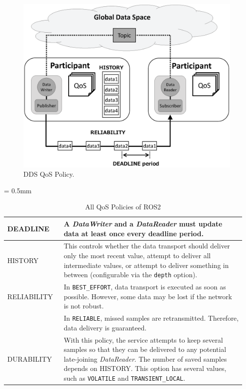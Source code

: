 \documentclass{sig-alternate-05-2015}
\begin{document}
\begin{figure}[t]
  \centering
  \includegraphics[width=0.8\linewidth]{../figure/DDS_qos.eps}
  \vspace{-3mm}
  \caption{\label{fig:orgparagraph4}
    DDS QoS Policy.}
  \vspace{-5mm}
\end{figure}

\renewcommand{\arraystretch}{1.0}
\begin{table}[t]
  \caption{\label{tab:orgtable1}
    All QoS Policies of ROS2}
  \centering
  \small
  \tabcolsep = 0.5mm              %
  \begin{tabular}{|p{0.23\linewidth}|p{0.74\linewidth}|}
    \hline
    DEADLINE &  A \emph{DataWriter} and a \emph{DataReader} must update data at least once every deadline period.\\
    \hline
    HISTORY &  This controls whether the data transport should deliver only the most recent value, attempt to deliver all intermediate values, or attempt to deliver something in between (configurable via the \texttt{depth} option).\\
    \hline
    RELIABILITY & In \texttt{BEST\_EFFORT}, data transport is executed as soon as possible. However, some data may be lost if the network is not robust. \\
    & In \texttt{RELIABLE}, missed samples are retransmitted. Therefore, data delivery is guaranteed.\\
    \hline
    DURABILITY & With this policy, the service attempts to keep several samples so that they can be delivered to any potential late-joining \emph{DataReader}. The number of saved samples depends on HISTORY. This option has several values, such as \texttt{VOLATILE} and \texttt{TRANSIENT\_LOCAL}.\\
    \hline
  \end{tabular}
  \vspace{-7mm}
\end{table}
\end{document}

